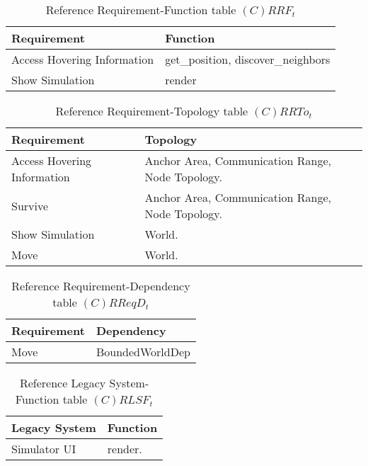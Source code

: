\begin{table}[H]
	\centering
	\begin{tabular}{|p{4cm}|p{8cm}|}
			\hline
			\textbf{Requirement} & \textbf{Function} \\
			\hline
			Access Hovering Information & get\_position, discover\_neighbors \\
			\hline
			Show Simulation & render \\
			\hline
		\end{tabular}
	\caption{Reference Requirement-Function table $(C)RRF_t$}
	\label{tab:crrft}
\end{table}

\begin{table}[H]
	\centering
	\begin{tabular}{|p{4cm}|p{8cm}|}
			\hline
			\textbf{Requirement} & \textbf{Topology} \\
			\hline
			Access Hovering Information & Anchor Area, Communication Range, Node Topology. \\
			\hline
			Survive & Anchor Area, Communication Range, Node Topology. \\
			\hline
			Show Simulation & World. \\
			\hline
			Move & World. \\
			\hline
		\end{tabular}
	\caption{Reference Requirement-Topology table $(C)RRTo_t$}
	\label{tab:crrtot}
\end{table}

\begin{table}[H]
	\centering
	\begin{tabular}{|p{4cm}|p{8cm}|}
			\hline
			\textbf{Requirement} & \textbf{Dependency} \\
			\hline
			Move & BoundedWorldDep  \\
			\hline
		\end{tabular}
		\caption{Reference Requirement-Dependency table $(C)RReqD_t$}
	\label{tab:crreqdt}
\end{table}

\begin{table}[H]
	\centering
	\begin{tabular}{|p{4cm}|p{8cm}|}
			\hline
			\textbf{Legacy System} & \textbf{Function} \\
			\hline
			Simulator UI & render. \\
			\hline
		\end{tabular}
	\caption{Reference Legacy System-Function table $(C)RLSF_t$}
	\label{tab:crlsft}
\end{table}

